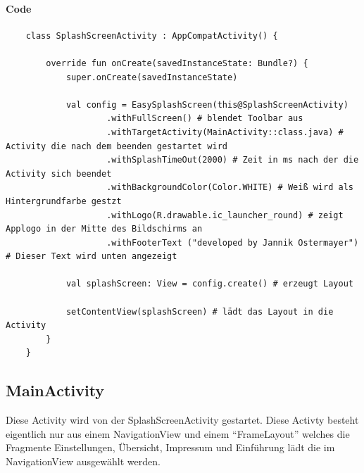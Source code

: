 \documentclass[a4paper]{article}
\begin{document}
\paragraph{Code}
\begin{verbatim}
	class SplashScreenActivity : AppCompatActivity() {

	    override fun onCreate(savedInstanceState: Bundle?) {
	        super.onCreate(savedInstanceState)

	        val config = EasySplashScreen(this@SplashScreenActivity)
	                .withFullScreen() # blendet Toolbar aus
	                .withTargetActivity(MainActivity::class.java) # Activity die nach dem beenden gestartet wird
	                .withSplashTimeOut(2000) # Zeit in ms nach der die Activity sich beendet
	                .withBackgroundColor(Color.WHITE) # Weiß wird als Hintergrundfarbe gestzt
	                .withLogo(R.drawable.ic_launcher_round) # zeigt Applogo in der Mitte des Bildschirms an
	            	.withFooterText ("developed by Jannik Ostermayer") # Dieser Text wird unten angezeigt

	        val splashScreen: View = config.create() # erzeugt Layout 

	        setContentView(splashScreen) # lädt das Layout in die Activity
	    }
	}
\end{verbatim}

\subsection{MainActivity}
Diese Activity wird von der SplashScreenActivity gestartet.
Diese Activty besteht eigentlich nur aus einem NavigationView und einem \enquote{FrameLayout} welches die Fragmente
Einstellungen, Übersicht, Impressum und Einführung lädt die im NavigationView ausgewählt werden. 
\end{document}
